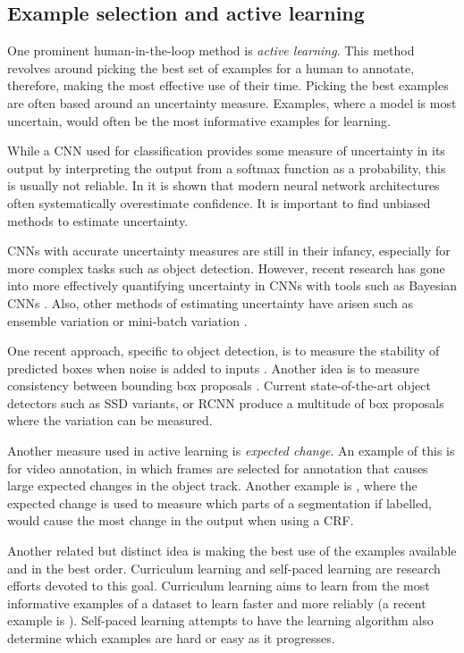 \subsection{Example selection and active learning} 

One prominent human-in-the-loop method is \emph{active learning}. This method revolves around picking the best set of examples for a human to annotate, therefore, making the most effective use of their time. Picking the best examples are often based around an uncertainty measure. Examples, where a model is most uncertain, would often be the most informative examples for learning. 
 
While a \gls{CNN} used for classification provides some measure of uncertainty in its output by interpreting the output from a softmax function as a probability, this is usually not reliable. In \cite{Guo2017} it is shown that modern neural network architectures often systematically overestimate confidence. It is important to find unbiased methods to estimate uncertainty.

\gls{CNN}s with accurate uncertainty measures are still in their infancy, especially for more complex tasks such as object detection. However, recent research has gone into more effectively quantifying uncertainty in \gls{CNN}s with tools such as Bayesian \gls{CNN}s \cite{Gal2017}. Also, other methods of estimating uncertainty have arisen such as ensemble variation \cite{Beluch2018} or mini-batch variation \cite{Chang2017}.

 One recent approach, specific to object detection, is to measure the stability of predicted boxes when noise is added to inputs \cite{Kao2018}. Another idea is to measure consistency between bounding box proposals \cite{Kao2018, Brust2018, Le2018}. Current state-of-the-art object detectors such as \gls{SSD}  \cite{Liu2016a} variants, or \gls{RCNN} \cite{Wang2017} produce a multitude of box proposals where the variation can be measured.

Another measure used in active learning is \emph{expected change}. An example of this is \cite{Vondrick2011} for video annotation, in which frames are selected for annotation that causes large expected changes in the object track. Another example is \cite{Xu2017}, where the expected change is used to measure which parts of a segmentation if labelled, would cause the most change in the output when using a \gls{CRF}.

Another related but distinct idea is making the best use of the examples available and in the best order. Curriculum learning and self-paced learning \cite{Kumar2010} are research efforts devoted to this goal. Curriculum learning aims to learn from the most informative examples of a dataset to learn faster and more reliably (a recent example is \cite{Katharopoulos2018}). Self-paced learning attempts to have the learning algorithm also determine which examples are hard or easy as it progresses.


